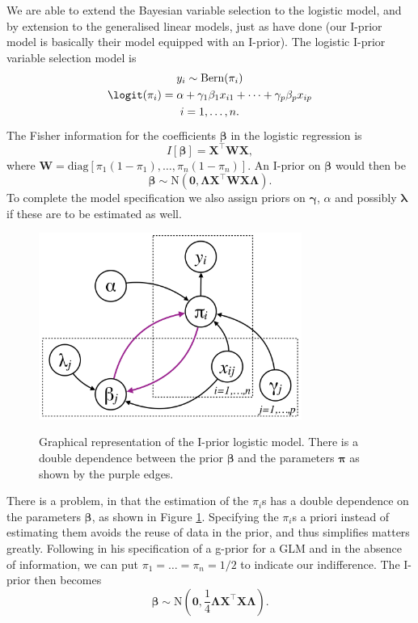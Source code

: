 We are able to extend the Bayesian variable selection to the logistic model, and by extension to the generalised linear models, just as \cite{Kuo1998} have done (our I-prior model is basically their model equipped with an I-prior). The logistic I-prior variable selection model is
\begin{align}
	\begin{gathered}
		y_i \sim \text{Bern}(\pi_i) \\
        \logit(\pi_i) = \alpha + \gamma_1\beta_1 x_{i1} + \cdots + \gamma_p\beta_p x_{ip} \\
        i=1,\dots,n.
	\end{gathered}
\end{align}
The Fisher information for the coefficients $\boldsymbol\beta$ in the logistic regression is
\[
	I[\boldsymbol\beta] = \mathbf X^\top \mathbf W \mathbf X,
\]
where $\mathbf W = \text{diag}[\pi_1(1-\pi_1), \dots, \pi_n(1-\pi_n)]$. An I-prior on $\boldsymbol\beta$ would then be
\[
	\boldsymbol\beta \sim \text{N}(\mathbf 0, \boldsymbol\Lambda\mathbf X^\top \mathbf W \mathbf X\boldsymbol\Lambda).
\]
To complete the model specification we also assign priors on $\boldsymbol{\gamma}$, $\alpha$ and possibly $\boldsymbol{\lambda}$ if these are to be estimated as well.

\begin{figure}[h]
	\centering
	\includegraphics[height=2.4in]{figure/logistic-iprior}
	\label{fig:logipriordep}
	\caption{Graphical representation of the I-prior logistic model. There is a double dependence between the prior $\boldsymbol\beta$ and the parameters $\boldsymbol{\pi}$ as shown by the purple edges.}
\end{figure}

There is a problem, in that the estimation of the $\pi_i$s has a double dependence on the parameters $\boldsymbol\beta$, as shown in Figure \ref{fig:logipriordep}. Specifying the $\pi_i$s a priori instead of estimating them avoids the reuse of data in the prior, and thus simplifies matters greatly. Following \cite{Ntzoufras2008} in his specification of a g-prior for a GLM and in the absence of information, we can put $\pi_1=\dots=\pi_n = 1/2$ to indicate our indifference. The I-prior then becomes
\[
\boldsymbol\beta \sim \text{N}\left(\mathbf 0, \frac{1}{4}\boldsymbol\Lambda\mathbf X^\top \mathbf X\boldsymbol\Lambda\right).
\]

